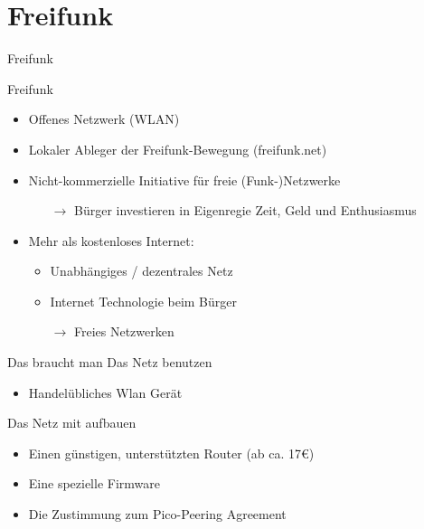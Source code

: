 \section{Freifunk}
\begin{frame}{}
    \begin{center}
        Freifunk
     \end{center}
\end{frame}

\begin{frame}{Freifunk}
    \begin{itemize}
        \item Offenes Netzwerk (WLAN)
        \item Lokaler Ableger der Freifunk-Bewegung (freifunk.net)
        \item Nicht-kommerzielle Initiative für freie (Funk-)Netzwerke
        \begin{itemize}
            \item[$\rightarrow$] Bürger investieren in Eigenregie Zeit, Geld und Enthusiasmus
        \end{itemize}
    \end{itemize}
        \vfill
    \begin{itemize}
        \item Mehr als \glqq{}kostenloses Internet\grqq:
        \begin{itemize}
            \item Unabhängiges / dezentrales Netz
            \item Internet Technologie beim Bürger
            \item[$\rightarrow$] Freies Netzwerken
        \end{itemize}
    \end{itemize}
\end{frame}

\begin{frame}{Das braucht man}
    Das Netz benutzen
    \begin{itemize}
        \item Handelübliches Wlan Gerät
    \end{itemize}

    \vfill

    Das Netz mit aufbauen
    \begin{itemize}
        \item Einen günstigen, unterstützten Router (ab ca. 17€)
        \item Eine spezielle Firmware
        \item Die Zustimmung zum \glqq{}Pico-Peering Agreement\grqq
    \end{itemize}
\end{frame}

